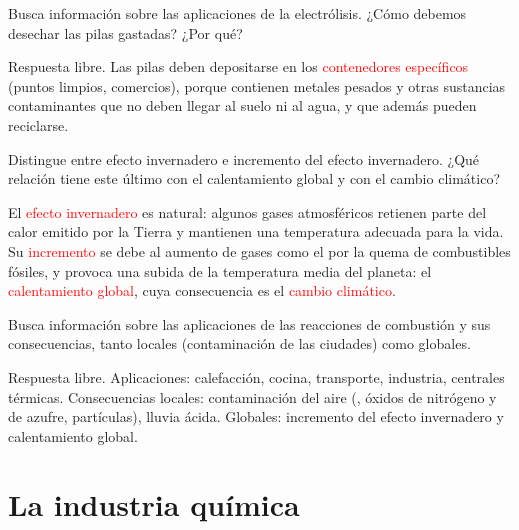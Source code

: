 \begin{exercise}
    Busca información sobre las aplicaciones de la electrólisis. ¿Cómo debemos desechar las pilas gastadas? ¿Por qué?
    \begin{solu}
        Respuesta libre. Las pilas deben depositarse en los \textcolor{red}{contenedores específicos} (puntos limpios, comercios), porque contienen metales pesados y otras sustancias contaminantes que no deben llegar al suelo ni al agua, y que además pueden reciclarse.
    \end{solu}
\end{exercise}

\begin{exercise}
    Distingue entre efecto invernadero e incremento del efecto invernadero. ¿Qué relación tiene este último con el calentamiento global y con el cambio climático?
    \begin{solu}
        El \textcolor{red}{efecto invernadero} es natural: algunos gases atmosféricos retienen parte del calor emitido por la Tierra y mantienen una temperatura adecuada para la vida. Su \textcolor{red}{incremento} se debe al aumento de gases como el  por la quema de combustibles fósiles, y provoca una subida de la temperatura media del planeta: el \textcolor{red}{calentamiento global}, cuya consecuencia es el \textcolor{red}{cambio climático}.
    \end{solu}
\end{exercise}

\begin{exercise}
    Busca información sobre las aplicaciones de las reacciones de combustión y sus consecuencias, tanto locales (contaminación de las ciudades) como globales.
    \begin{solu}
        Respuesta libre. Aplicaciones: calefacción, cocina, transporte, industria, centrales térmicas. Consecuencias locales: contaminación del aire (, óxidos de nitrógeno y de azufre, partículas), lluvia ácida. Globales: incremento del efecto invernadero y calentamiento global.
    \end{solu}
\end{exercise}

\section{La industria química}

